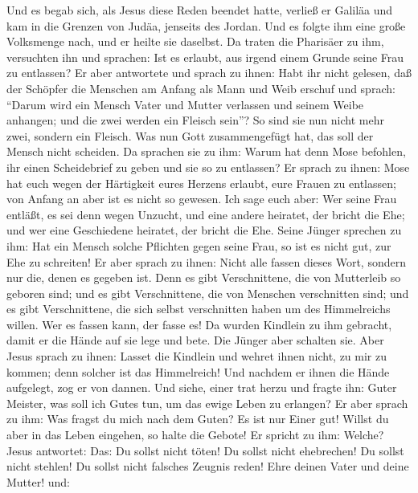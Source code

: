  Und es begab sich, als Jesus diese Reden beendet hatte,
verließ er Galiläa und kam in die Grenzen von Judäa, jenseits des
Jordan.  Und es folgte ihm eine große Volksmenge nach, und
er heilte sie daselbst.  Da traten die Pharisäer zu ihm,
versuchten ihn und sprachen: Ist es erlaubt, aus irgend einem Grunde
seine Frau zu entlassen?  Er aber antwortete und sprach zu
ihnen: Habt ihr nicht gelesen, daß der Schöpfer die Menschen am Anfang
als Mann und Weib erschuf  und sprach: ``Darum wird ein
Mensch Vater und Mutter verlassen und seinem Weibe anhangen; und die
zwei werden ein Fleisch sein''?  So sind sie nun nicht
mehr zwei, sondern ein Fleisch. Was nun Gott zusammengefügt hat, das
soll der Mensch nicht scheiden.  Da sprachen sie zu ihm:
Warum hat denn Mose befohlen, ihr einen Scheidebrief zu geben und sie so
zu entlassen?  Er sprach zu ihnen: Mose hat euch wegen der
Härtigkeit eures Herzens erlaubt, eure Frauen zu entlassen; von Anfang
an aber ist es nicht so gewesen.  Ich sage euch aber: Wer
seine Frau entläßt, es sei denn wegen Unzucht, und eine andere heiratet,
der bricht die Ehe; und wer eine Geschiedene heiratet, der bricht die
Ehe.  Seine Jünger sprechen zu ihm: Hat ein Mensch solche
Pflichten gegen seine Frau, so ist es nicht gut, zur Ehe zu schreiten!
 Er aber sprach zu ihnen: Nicht alle fassen dieses Wort,
sondern nur die, denen es gegeben ist.  Denn es gibt
Verschnittene, die von Mutterleib so geboren sind; und es gibt
Verschnittene, die von Menschen verschnitten sind; und es gibt
Verschnittene, die sich selbst verschnitten haben um des Himmelreichs
willen. Wer es fassen kann, der fasse es!  Da wurden
Kindlein zu ihm gebracht, damit er die Hände auf sie lege und bete. Die
Jünger aber schalten sie.  Aber Jesus sprach zu ihnen:
Lasset die Kindlein und wehret ihnen nicht, zu mir zu kommen; denn
solcher ist das Himmelreich!  Und nachdem er ihnen die
Hände aufgelegt, zog er von dannen.  Und siehe, einer
trat herzu und fragte ihn: Guter Meister, was soll ich Gutes tun, um das
ewige Leben zu erlangen?  Er aber sprach zu ihm: Was
fragst du mich nach dem Guten? Es ist nur Einer gut! Willst du aber in
das Leben eingehen, so halte die Gebote!  Er spricht zu
ihm: Welche? Jesus antwortet: Das: Du sollst nicht töten! Du sollst
nicht ehebrechen! Du sollst nicht stehlen! Du sollst nicht falsches
Zeugnis reden!  Ehre deinen Vater und deine Mutter! und:
